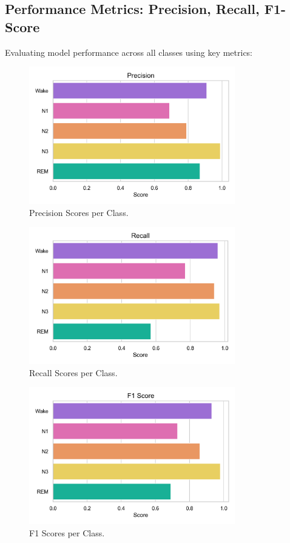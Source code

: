 \subsection{Performance Metrics: Precision, Recall, F1-Score}

Evaluating model performance across all classes using key metrics:

\begin{figure}[h!]
    \centering
    \includegraphics[width=0.8\textwidth]{img/precision_plot.png}
    \caption{Precision Scores per Class.}
\end{figure}

\begin{figure}[h!]
    \centering
    \includegraphics[width=0.8\textwidth]{img/recall_plot.png}
    \caption{Recall Scores per Class.}
\end{figure}

\begin{figure}[h!]
    \centering
    \includegraphics[width=0.8\textwidth]{img/f1_score_plot.png}
    \caption{F1 Scores per Class.}
\end{figure}

